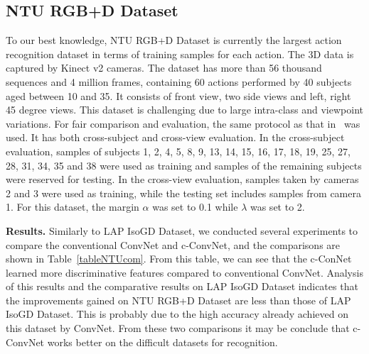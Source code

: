 \documentclass[letterpaper]{article} %
\begin{document}
\subsection{ NTU RGB+D Dataset}
 To our best knowledge, NTU RGB+D Dataset is currently the largest action
recognition dataset in terms of training samples for each action. The 3D data is
captured by Kinect v2 cameras. The dataset has more than 56 thousand sequences
and 4 million frames, containing 60 actions performed by 40 subjects aged
between 10 and 35. It consists of front view, two side views and left, right 45
degree views. This dataset is challenging due to large intra-class and
viewpoint variations. For fair comparison and evaluation, the same protocol as
that in~\cite{shahroudy2016ntu} was used. It has both cross-subject and
cross-view evaluation. In the cross-subject evaluation, samples of subjects 1,
2, 4, 5, 8,
9, 13, 14, 15, 16, 17, 18, 19, 25, 27, 28, 31, 34, 35 and 38 were used as
training and samples of the remaining subjects were reserved for testing. In the
cross-view evaluation, samples taken by cameras 2 and 3 were used as training,
while the testing set includes samples from camera 1. For this dataset, the
margin $\alpha$ was set to 0.1 while $\lambda$ was set to 2.

\textbf{Results.} Similarly to LAP IsoGD Dataset, we conducted several
experiments to compare the conventional ConvNet and c-ConvNet, and the
comparisons are shown in Table~\ref{tableNTUcom}. From this table, we can
see that the c-ConNet learned more discriminative features compared
to conventional ConvNet.
Analysis of this results and the comparative results on LAP IsoGD Dataset
indicates that the improvements gained on NTU RGB+D Dataset are less than those
of LAP IsoGD Dataset. This is probably due to the high accuracy already
achieved on this dataset by ConvNet. From these two comparisons it may
be conclude that c-ConvNet works better on the difficult datasets for
recognition.
\end{document}
